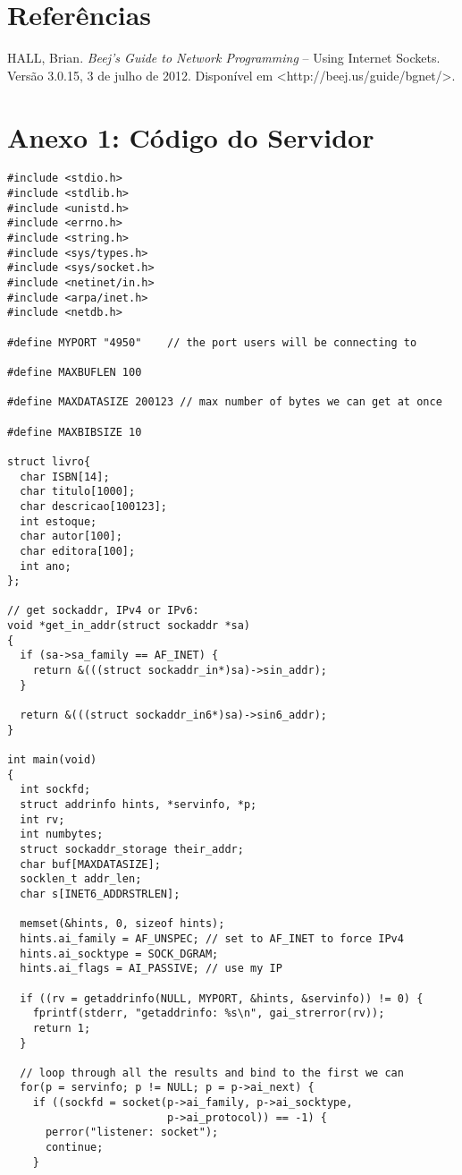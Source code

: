 \documentclass[11pt, brazil]{article} %
\begin{document}
\section{Referências}

HALL, Brian. \emph{Beej's Guide to Network Programming} -- Using Internet Sockets. Versão 3.0.15, 3 de julho de 2012. Disponível em <http://beej.us/guide/bgnet/>.

\section*{Anexo 1: Código do Servidor}

\begin{verbatim}
#include <stdio.h>
#include <stdlib.h>
#include <unistd.h>
#include <errno.h>
#include <string.h>
#include <sys/types.h>
#include <sys/socket.h>
#include <netinet/in.h>
#include <arpa/inet.h>
#include <netdb.h>

#define MYPORT "4950"    // the port users will be connecting to

#define MAXBUFLEN 100

#define MAXDATASIZE 200123 // max number of bytes we can get at once

#define MAXBIBSIZE 10

struct livro{
  char ISBN[14];
  char titulo[1000];
  char descricao[100123];
  int estoque;
  char autor[100];
  char editora[100];
  int ano;
};

// get sockaddr, IPv4 or IPv6:
void *get_in_addr(struct sockaddr *sa)
{
  if (sa->sa_family == AF_INET) {
    return &(((struct sockaddr_in*)sa)->sin_addr);
  }

  return &(((struct sockaddr_in6*)sa)->sin6_addr);
}

int main(void)
{
  int sockfd;
  struct addrinfo hints, *servinfo, *p;
  int rv;
  int numbytes;
  struct sockaddr_storage their_addr;
  char buf[MAXDATASIZE];
  socklen_t addr_len;
  char s[INET6_ADDRSTRLEN];

  memset(&hints, 0, sizeof hints);
  hints.ai_family = AF_UNSPEC; // set to AF_INET to force IPv4
  hints.ai_socktype = SOCK_DGRAM;
  hints.ai_flags = AI_PASSIVE; // use my IP

  if ((rv = getaddrinfo(NULL, MYPORT, &hints, &servinfo)) != 0) {
    fprintf(stderr, "getaddrinfo: %s\n", gai_strerror(rv));
    return 1;
  }

  // loop through all the results and bind to the first we can
  for(p = servinfo; p != NULL; p = p->ai_next) {
    if ((sockfd = socket(p->ai_family, p->ai_socktype,
                         p->ai_protocol)) == -1) {
      perror("listener: socket");
      continue;
    }


\end{verbatim}
\end{document}
